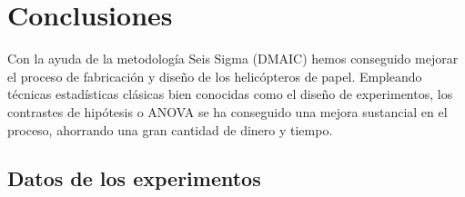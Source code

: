 \documentclass[12pt,a4paper,twoside,openright,titlepage,final]{article}
\begin{document}
\section{Conclusiones}

Con la ayuda de la metodología Seis Sigma (DMAIC) hemos conseguido mejorar el proceso de fabricación y diseño de los helicópteros de papel. Empleando técnicas estadísticas clásicas bien conocidas como el diseño de experimentos, los contrastes de hipótesis o ANOVA se ha conseguido una mejora sustancial en el proceso, ahorrando una gran cantidad de dinero y tiempo.

%
%

\begin{appendices}
	\section{Datos de los experimentos} \label{chp:experimentos}
\end{appendices}
\end{document}
